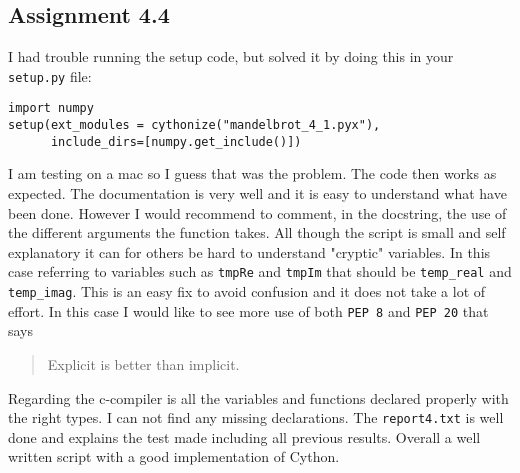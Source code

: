 \documentclass[a4paper]{article}
\begin{document}
\subsection*{Assignment 4.4}
I had trouble running the setup code, but solved it by doing this in your \texttt{setup.py} file:
\begin{verbatim}
import numpy
setup(ext_modules = cythonize("mandelbrot_4_1.pyx"),
      include_dirs=[numpy.get_include()])
\end{verbatim}
I am testing on a mac so I guess that was the problem.
\newline\newline
The code then works as expected.
\newline\newline
The documentation is very well and it is easy to understand what have been done. However I would recommend to comment, in the docstring, the use of the different arguments the function takes.
\newline\newline
All though the script is small and self explanatory it can for others be hard to understand "cryptic" variables. In this case referring to variables such as \texttt{tmpRe} and \texttt{tmpIm} that should be \texttt{temp\_real} and \texttt{temp\_imag}. This is an easy fix to avoid confusion and it does not take a lot of effort. In this case I would like to see more use of both \texttt{PEP 8} and \texttt{PEP 20} that says 
\begin{quote}
    Explicit is better than implicit.
\end{quote}
\newline\newline
Regarding the c-compiler is all the variables and functions declared properly with the right types. I can not find any missing declarations.
\newline\newline
The \texttt{report4.txt} is well done and explains the test made including all previous results.
\newline\newline
Overall a well written script with a good implementation of Cython.


\end{document}
